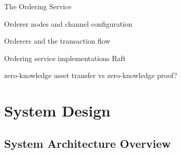 The Ordering Service

Orderer nodes and channel configuration

Orderers and the transaction flow

Ordering service implementations
Raft %

zero-knowledge asset transfer vs zero-knowledge proof? \linebreak[1]

\section{System Design}
\subsection{System Architecture Overview}

